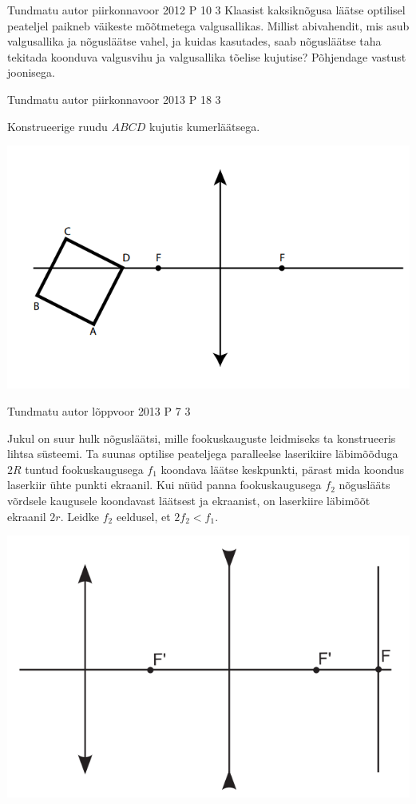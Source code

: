 \documentclass[11pt]{article}
\begin{document}
{%
{Tundmatu autor} %
{piirkonnavoor} %
{2012} %
{P 10} %
{3} %
{
\ifStatement
Klaasist kaksiknõgusa läätse optilisel peateljel paikneb väikeste mõõtmetega valgusallikas. Millist abivahendit, mis asub valgusallika ja nõgusläätse vahel, ja kuidas kasutades, saab nõgusläätse taha tekitada koonduva valgusvihu ja valgusallika tõelise kujutise? Põhjendage vastust joonisega.
\fi
}


{Tundmatu autor} %
{piirkonnavoor} %
{2013} %
{P 18} %
{3} %
{
\ifStatement
Konstrueerige ruudu $ABCD$ kujutis kumerläätsega.
\begin{center}
	\includegraphics[width=0.5\linewidth]{2013-v2p-18-yl.PNG}
\end{center}
\fi
}

{Tundmatu autor} %
{lõppvoor} %
{2013} %
{P 7} %
{3} %
{
\ifStatement
Jukul on suur hulk nõgusläätsi, mille fookuskauguste leidmiseks ta konstrueeris lihtsa
süsteemi. Ta suunas optilise peateljega paralleelse laserikiire läbimõõduga $2R$ tuntud
fookuskaugusega $f_1$ koondava läätse keskpunkti, pärast mida koondus laserkiir ühte punkti
ekraanil. Kui nüüd panna fookuskaugusega $f_2$ nõguslääts võrdsele kaugusele koondavast
läätsest ja ekraanist, on laserkiire läbimõõt ekraanil $2r$. Leidke $f_2$ eeldusel, et $2f_2 < f_1$.
\begin{center}
	\includegraphics[width=0.5\linewidth]{2013-v3p-07-yl.png}
\end{center}
\fi
}

}
\end{document}
